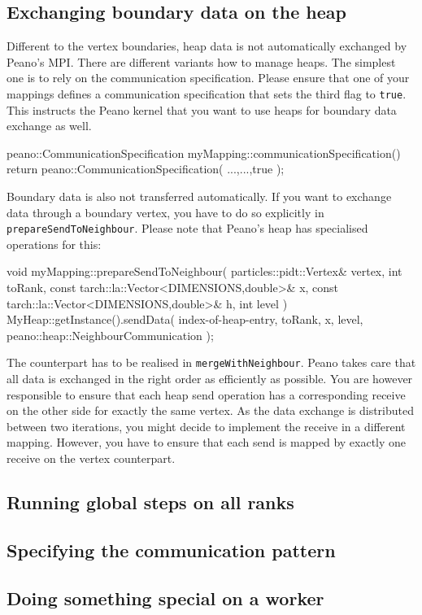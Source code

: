 \subsection{Exchanging boundary data on the heap}

Different to the vertex boundaries, heap data is not automatically exchanged by
Peano's MPI. 
There are different variants how to manage heaps. 
The simplest one is to rely on the communication specification. 
Please ensure that one of your mappings defines a communication specification
that sets the third flag to \texttt{true}.
This instructs the Peano kernel that you want to use heaps for boundary data
exchange as well.
\begin{code}
peano::CommunicationSpecification  
myMapping::communicationSpecification() { 
  return peano::CommunicationSpecification( ...,...,true );
}
\end{code}

\noindent
Boundary data is also not transferred automatically. 
If you want to exchange data through a boundary vertex, you have to do so
explicitly in \texttt{prepareSendToNeighbour}.
Please note that Peano's heap has specialised operations for this:
\begin{code}
void myMapping::prepareSendToNeighbour(
  particles::pidt::Vertex&                      vertex,
  int                                           toRank,
  const tarch::la::Vector<DIMENSIONS,double>&   x,
  const tarch::la::Vector<DIMENSIONS,double>&   h,
  int                                           level
) {
  MyHeap::getInstance().sendData(
    index-of-heap-entry,
    toRank,
    x,
    level,
    peano::heap::NeighbourCommunication
  );
}
\end{code}

\noindent
The counterpart has to be realised in \texttt{mergeWithNeighbour}.
Peano takes care that all data is exchanged in the right order as efficiently as
possible.
You are however responsible to ensure that each heap send operation has a
corresponding receive on the other side for exactly the same vertex.
As the data exchange is distributed between two iterations, you might decide to
implement the receive in a different mapping.
However, you have to ensure that each send is mapped by exactly one receive on
the vertex counterpart.

\subsection{Running global steps on all ranks}

\subsection{Specifying the communication pattern}

\subsection{Doing something special on a worker}
